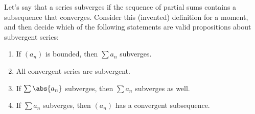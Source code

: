 \documentclass{lew98_solutions}
\begin{document}
\begin{exercise}
\label{ex:2.7.6}
    Let's say that a series subverges if the sequence of partial sums contains a subsequence that converges. Consider this (invented) definition for a moment, and then decide which of the following statements are valid propositions about subvergent series:
    \begin{enumerate}
        \item If \( (a_n) \) is bounded, then \( \sum a_n \) subverges.

        \item All convergent series are subvergent.

        \item If \( \sum \abs{a_n} \) subverges, then \( \sum a_n \) subverges as well.

        \item If \( \sum a_n \) subverges, then \( (a_n) \) has a convergent subsequence.
    \end{enumerate}
\end{exercise}
\end{document}
